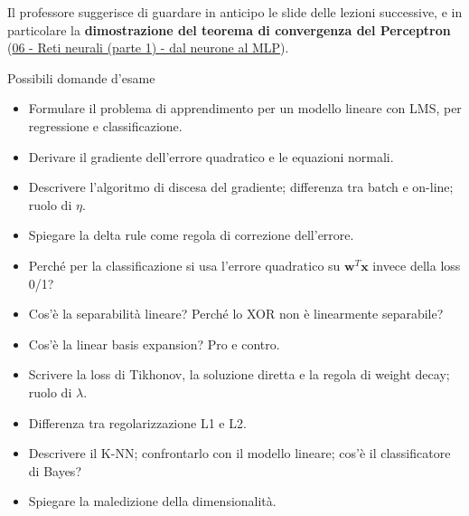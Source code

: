 Il professore suggerisce di guardare in anticipo le slide delle lezioni
successive, e in particolare la \textbf{dimostrazione del teorema di
convergenza del Perceptron}
(\href{06\%20-\%20Reti\%20neurali\%20(parte\%201)\%20-\%20dal\%20neurone\%20al\%20MLP}{06
- Reti neurali (parte 1) - dal neurone al MLP}).

\begin{boxquestion}{Possibili domande d'esame}

\begin{itemize}
\tightlist
\item
  Formulare il problema di apprendimento per un modello lineare con LMS,
  per regressione e classificazione.
\item
  Derivare il gradiente dell'errore quadratico e le equazioni normali.
\item
  Descrivere l'algoritmo di discesa del gradiente; differenza tra batch
  e on-line; ruolo di \(\eta\).
\item
  Spiegare la delta rule come regola di correzione dell'errore.
\item
  Perché per la classificazione si usa l'errore quadratico su
  \(\mathbf{w}^T\mathbf{x}\) invece della loss 0/1?
\item
  Cos'è la separabilità lineare? Perché lo XOR non è linearmente
  separabile?
\item
  Cos'è la linear basis expansion? Pro e contro.
\item
  Scrivere la loss di Tikhonov, la soluzione diretta e la regola di
  weight decay; ruolo di \(\lambda\).
\item
  Differenza tra regolarizzazione L1 e L2.
\item
  Descrivere il K-NN; confrontarlo con il modello lineare; cos'è il
  classificatore di Bayes?
\item
  Spiegare la maledizione della dimensionalità.
\end{itemize}

\end{boxquestion}
